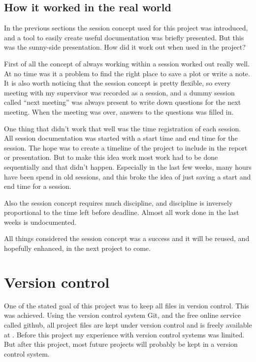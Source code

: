 \subsection{How it worked in the real world}
In the previous sections the session concept used for this project was introduced, and a tool to easily create useful documentation was briefly presented. But this was the sunny-side presentation. How did it work out when used in the project? \par
First of all the concept of always working within a session worked out really well. At no time was it a problem to find the right place to save a plot or write a note. It is also worth noticing that the session concept is pretty flexible, so every meeting with my supervisor was recorded as a session, and a dummy session called ``next meeting'' was always present to write down questions for the next meeting. When the meeting was over, answers to the questions was filled in. \par
One thing that didn't work that well was the time registration of each session. All session documentation was started with a start time and end time for the session. The hope was to create a timeline of the project to include in the report or presentation. But to make this idea work most work had to be done sequentially and that didn't happen. Especially in the last few weeks, many hours have been spend in old sessions, and this broke the idea of just saving a start and end time for a session.\par
Also the session concept requires much discipline, and discipline is inversely proportional to the time left before deadline. Almost all work done in the last weeks is undocumented.\par
All things considered the session concept was a success and it will be reused, and hopefully enhanced, in the next project to come.


\section{Version control}
One of the stated goal of this project was to keep all files in version control. This was achieved. Using the version control system Git, and the free online service called github, all project files are kept under version control and is freely available at \githuburl{}. Before this project my experience with version control systems was limited. But after this project, most future projects will probably be kept in a version control system.

